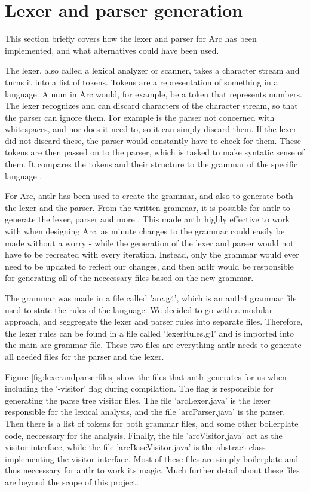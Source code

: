 \section{Lexer and parser generation}\label{sec:lexerandparsergen}

This section briefly covers how the lexer and parser for Arc has been implemented, and what alternatives could have been used.

The lexer, also called a lexical analyzer or scanner, takes a character stream and turns it into a list of tokens. Tokens are a representation of something in a language. A num in Arc would, for example, be a token that represents numbers. The lexer recognizes and can discard characters of the character stream, so that the parser can ignore them. For example is the parser not concerned with whitespaces, and nor does it need to, so it can simply discard them. If the lexer did not discard these, the parser would constantly have to check for them. These tokens are then passed on to the parser, which is tasked to make syntatic sense of them. It compares the tokens and their structure to the grammar of the specific language \cite{Parr2014}.

For Arc, \gls{antlr} has been used to create the grammar, and also to generate both the lexer and the parser. From the written grammar, it is possible for \gls{antlr} to generate the lexer, parser and more \cite{Parr2014}. This made \gls{antlr} highly effective to work with when designing Arc, as minute changes to the grammar could easily be made without a worry - while the generation of the lexer and parser would not have to be recreated with every iteration. Instead, only the grammar would ever need to be updated to reflect our changes, and then \gls{antlr} would be responsible for generating all of the neccessary files based on the new grammar.

The grammar was made in a file called 'arc.g4', which is an \gls{antlr}4 grammar file used to state the rules of the language. We decided to go with a modular approach, and seggregate the lexer and parser rules into separate files. Therefore, the lexer rules can be found in a file called 'lexerRules.g4' and is imported into the main arc grammar file. These two files are everything \gls{antlr} needs to generate all needed files for the parser and the lexer.

Figure \ref{fig:lexerandparserfiles} show the files that \gls{antlr} generates for us when including the '-visitor' flag during compilation. The flag is responsible for generating the parse tree visitor files. The file 'arcLexer.java' is the lexer responsible for the lexical analysis, and the file 'arcParser.java' is the parser. Then there is a list of tokens for both grammar files, and some other boilerplate code, neccessary for the analysis. Finally, the file 'arcVisitor.java' act as the visitor interface, while the file 'arcBaseVisitor.java' is the abstract class implementing the visitor interface. Most of these files are simply boilerplate and thus neccessary for \gls{antlr} to work its magic. Much further detail about these files are beyond the scope of this project.

